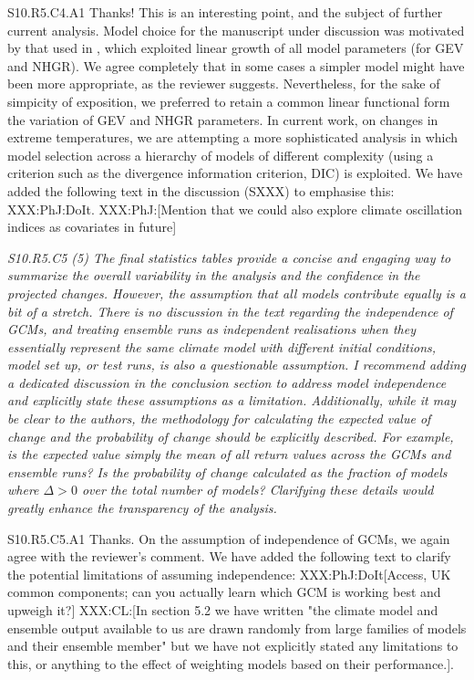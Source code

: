 \documentclass[a4paper,10pt]{article}
\begin{document}
	S10.R5.C4.A1 Thanks! This is an interesting point, and the subject of further current analysis. Model choice for the manuscript under discussion was motivated by that used in \cite{EwnJnt23a}, which exploited linear growth of all model parameters (for GEV and NHGR). We agree completely that in some cases a simpler model might have been more appropriate, as the reviewer suggests. Nevertheless, for the sake of simpicity of exposition, we preferred to retain a common linear functional form the variation of GEV and NHGR parameters. In current work, on changes in extreme temperatures, we are attempting a more sophisticated analysis in which model selection across a hierarchy of models of different complexity (using a criterion such as the divergence information criterion, DIC) is exploited. We have added the following text in the discussion (SXXX) to emphasise this: XXX:PhJ:DoIt. XXX:PhJ:[Mention that we could also explore climate oscillation indices as covariates in future]

	\emph{S10.R5.C5 (5) The final statistics tables provide a concise and engaging way to summarize the overall variability in the analysis and the confidence in the projected changes. However, the assumption that all models contribute equally is a bit of a stretch. There is no discussion in the text regarding the independence of GCMs, and treating ensemble runs as independent realisations when they essentially represent the same climate model with different initial conditions, model set up, or test runs, is also a questionable assumption. I recommend adding a dedicated discussion in the conclusion section to address model independence and explicitly state these assumptions as a limitation. Additionally, while it may be clear to the authors, the methodology for calculating the expected value of change and the probability of change should be explicitly described. For example, is the expected value simply the mean of all return values across the GCMs and ensemble runs? Is the probability of change calculated as the fraction of models where $\Delta > 0$ over the total number of models? Clarifying these details would greatly enhance the transparency of the analysis.}

	S10.R5.C5.A1 Thanks. On the assumption of independence of GCMs, we again agree with the reviewer's comment. We have added the following text to clarify the potential limitations of assuming independence: XXX:PhJ:DoIt[Access, UK common components; can you actually learn which GCM is working best and upweigh it?] XXX:CL:[In section 5.2 we have written "the climate model and ensemble output available to us are drawn randomly from large families of models and their ensemble member" but we have not explicitly stated any limitations to this, or anything to the effect of weighting models based on their performance.].
\end{document}
